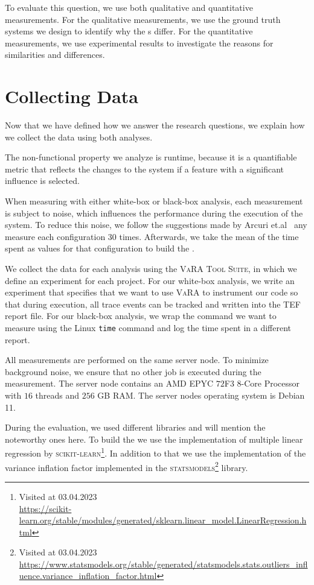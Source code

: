 To evaluate this question, we use both qualitative and quantitative measurements. 
For the qualitative measurements, we use the ground truth systems we design to identify why the {\perfInfluenceModel}s differ. 
For the quantitative measurements, we use experimental results to investigate the reasons for similarities and differences.

\section{Collecting Data}\label{ch:collect-data}
Now that we have defined how we answer the research questions, we explain how we collect the data using both analyses.

The non-functional property we analyze is runtime, because it is a quantifiable metric
that reflects the changes to the system if a feature with a significant influence is selected.

When measuring with either white-box or black-box analysis, 
each measurement is subject to noise, which influences the performance during the execution of the system. 
To reduce this noise, we follow the suggestions made by Arcuri et.al~\cite{SampleSize} any
measure each configuration 30 times. Afterwards, we take the mean of the time spent as values for that configuration to build the {\perfInfluenceModel}.

We collect the data for each analysis using the \textsc{VaRA Tool Suite}, in which we define an experiment for each project. 
For our white-box analysis, we write an experiment that specifies that we want to use \textsc{VaRA} to instrument our code so that during execution, 
all trace events can be tracked and written into the \acs{TEF} report file. For our black-box analysis, 
we wrap the command we want to measure using the Linux \texttt{time} command and log the time spent in a different report. 

All measurements are performed on the same server node. To minimize background noise, we ensure that no other job is executed during the measurement. 
The server node contains an AMD EPYC $72$F$3$ $8$-Core Processor with $16$ threads and $256$ GB RAM. The server nodes operating system
is Debian 11.

During the evaluation, we used different libraries and will mention the noteworthy ones here.
To build the {\perfInfluenceModel} we use the implementation of multiple linear regression by \textsc{scikit-learn}\footnote{Visited at 03.04.2023\\ \url{https://scikit-learn.org/stable/modules/generated/sklearn.linear_model.LinearRegression.html}}.
In addition to that we use the implementation of the variance inflation factor implemented in the \textsc{statsmodels}\footnote{Visited at 03.04.2023\\ \url{https://www.statsmodels.org/stable/generated/statsmodels.stats.outliers_influence.variance_inflation_factor.html}} library.

